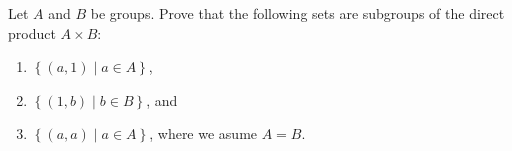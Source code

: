 \begin{questions}
\question
Let \(A\) and \(B\) be groups. Prove that the following sets are subgroups of the direct product \(A \times B\):
\begin{enumerate}[label=(\alph*)]
    \item \(\left\{ (a,1) \mid a\in A \right\}\),
    \item \(\left\{ (1,b) \mid b\in B \right\}\), and
    \item \(\left\{ (a,a) \mid a\in A \right\}\), where we asume \(A= B\).
\end{enumerate}




\question



















































\end{questions}